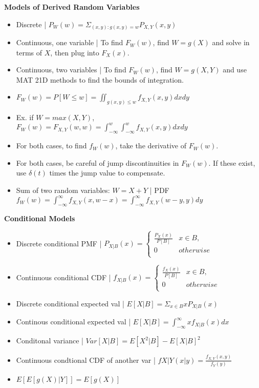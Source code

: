 \documentclass[8pt]{article}
\begin{document}
\textbf{Models of Derived Random Variables}
\begin{itemize}
    \item Discrete | $P_W(w) = \Sigma_{(x, y): g(x,y) = w} P_{X,Y}(x, y)$
    \item Continuous, one variable | To find $F_W(w)$, find $W = g(X)$ and solve in terms of $X$, then plug into $F_X(x)$.
    \item Continuous, two variables | To find $F_W(w)$, find $W = g(X, Y)$ and use MAT 21D methods to find the bounds of integration.
    \item $F_W(w) = P[W \leq w] = \iint_{g(x,y) \leq w} f_{X,Y}(x, y) dx dy$
    \item Ex. if $W = max(X, Y)$, $F_W(w) = F_{X,Y}(w, w) = \int_{-\infty}^w \int_{-\infty}^w f_{X,Y}(x, y) dx dy$
    \item For both cases, to find $f_W(w)$, take the derivative of $F_W(w)$.
    \item For both cases, be careful of jump discontinuities in $F_W(w)$. If these exist, use $\delta(t)$ times the jump value to compensate.
    \item Sum of two random variables: $W = X + Y$ | PDF $f_W(w) = \int_{-\infty}^\infty f_{X,Y}(x, w - x) = \int_{-\infty}^\infty f_{X,Y}(w - y, y) dy$
\end{itemize}
\textbf{Conditional Models}
\begin{itemize}
    \item Discrete conditional PMF | $P_{X|B}(x) = \begin{cases}
        \frac{P_X(x)}{P[B]} & x \in B, \\
        0 & otherwise \\
    \end{cases}$
    \item Continuous conditional CDF | $f_{X|B}(x) = \begin{cases}
        \frac{f_X(x)}{P[B]} & x \in B, \\
        0 & otherwise \\
    \end{cases}$
    \item Discrete conditional expected val | $E[X|B] = \Sigma_{x \in B} xP_{X|B}(x)$
    \item Continous conditional expected val | $E[X|B] = \int_{-\infty}^\infty xf_{X|B}(x)dx$
    \item Conditonal variance | $Var[X|B] = E[X^2|B] - E[X|B]^2$
    \item Continuous condtional CDF of another var | $f{X|Y}(x|y) = \frac{f_{X,Y}(x, y)}{f_Y(y)}$
    \item $E[E[g(X)|Y]] = E[g(X)]$
\end{itemize}
\end{document}
